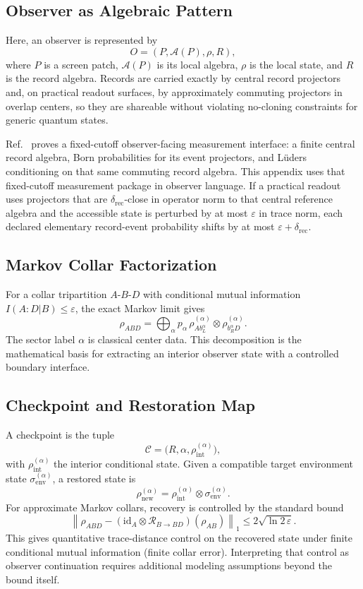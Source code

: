 \subsection{Observer as Algebraic Pattern}

Here, an observer is represented by
\[
O=(P,\mathcal{A}(P),\rho,R),
\]
where \(P\) is a screen patch, \(\mathcal{A}(P)\) is its local algebra, \(\rho\) is the local
state, and \(R\) is the record algebra. Records are carried exactly by central record projectors
and, on practical readout surfaces, by approximately commuting projectors in overlap centers, so
they are shareable without violating no-cloning constraints for generic quantum states.

Ref.~\cite{ophmicrophysics} proves a fixed-cutoff observer-facing measurement interface: a
finite central record algebra, Born probabilities for its event projectors, and L\"uders
conditioning on that same commuting record algebra. This appendix uses that fixed-cutoff
measurement package in observer language. If a practical readout uses projectors that are
\(\delta_{\mathrm{rec}}\)-close in operator norm to that central reference algebra and the
accessible state is perturbed by at most \(\varepsilon\) in trace norm, each declared elementary
record-event probability shifts by at most \(\varepsilon+\delta_{\mathrm{rec}}\).

\subsection{Markov Collar Factorization}

For a collar tripartition \(A\)-\(B\)-\(D\) with conditional mutual information
\(I(A:D|B)\le\varepsilon\), the exact Markov limit gives
\[
\rho_{ABD}
=\bigoplus_{\alpha} p_{\alpha}\,
\rho^{(\alpha)}_{A b_L^{\alpha}}
\otimes
\rho^{(\alpha)}_{b_R^{\alpha} D}.
\]
The sector label \(\alpha\) is classical center data. This decomposition is the mathematical
basis for extracting an interior observer state with a controlled boundary interface.

\subsection{Checkpoint and Restoration Map}

A checkpoint is the tuple
\[
\mathcal{C}=\bigl(R,\alpha,\rho_{\mathrm{int}}^{(\alpha)}\bigr),
\]
with \(\rho_{\mathrm{int}}^{(\alpha)}\) the interior conditional state. Given a compatible target
environment state \(\sigma_{\mathrm{env}}^{(\alpha)}\), a restored state is
\[
\rho_{\mathrm{new}}^{(\alpha)}
=
\rho_{\mathrm{int}}^{(\alpha)}
\otimes
\sigma_{\mathrm{env}}^{(\alpha)}.
\]
For approximate Markov collars, recovery is controlled by the standard bound
\[
\left\|
\rho_{ABD}
-
(\mathrm{id}_A\otimes\mathcal{R}_{B\to BD})(\rho_{AB})
\right\|_1
\le
2\sqrt{\ln 2\,\varepsilon}.
\]
This gives quantitative trace-distance control on the recovered state under finite conditional
mutual information (finite collar error). Interpreting that control as observer continuation
requires additional modeling assumptions beyond the bound itself.

